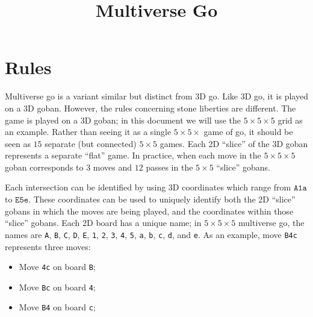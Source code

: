 \documentclass{article}
\title{Multiverse Go}
\date{}
\begin{document}
\maketitle

\pagestyle{empty}

\section{Rules}

Multiverse go is a variant similar but distinct from 3D go.  Like 3D go, it is
played on a 3D goban.  However, the rules concerning stone liberties are
different.
%
The game is played on a 3D goban;  in this document we will use the $5\times
5\times 5$ grid as an example.  Rather than seeing it as a single $5 \times
5\times$ game of go, it should be seen as $15$ separate (but connected)
$5\times 5$ games.  Each 2D ``slice'' of the 3D goban represents a separate
``flat'' game.  In practice, when each move in the $5\times 5\times 5$ goban
corresponds to $3$ moves and $12$ passes in the $5\times 5$ ``slice'' gobans.

Each intersection can be identified by using 3D coordinates which range from
$\texttt{A1a}$ to $\texttt{E5e}$.  These coordinates can be used to uniquely
identify both the 2D ``slice'' gobans in which the moves are being played, and
the coordinates within those ``slice'' gobans.
%
Each 2D board has a unique name;  in $5\times 5\times 5$ multiverse go, the
names are 
%
\texttt{A}, \texttt{B}, \texttt{C}, \texttt{D}, \texttt{E},
%
\texttt{1}, \texttt{2}, \texttt{3}, \texttt{4}, \texttt{5},
%
\texttt{a}, \texttt{b}, \texttt{c}, \texttt{d}, and \texttt{e}.
%
As an example, move \texttt{B4c} represents three moves:
%
\begin{itemize}
  \item Move \texttt{4c} on board \texttt{B};
  \item Move \texttt{Bc} on board \texttt{4};
  \item Move \texttt{B4} on board \texttt{c};
\end{itemize}

\end{document}

